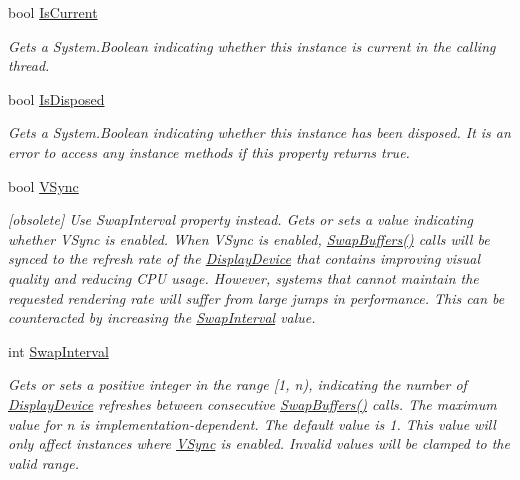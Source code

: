 \begin{DoxyCompactItemize}
bool \hyperlink{class_open_t_k_1_1_graphics_1_1_graphics_context_a7cbde7e3ab34ace4c087db96a72f6134}{Is\-Current}
\begin{DoxyCompactList}\small\item\em Gets a System.\-Boolean indicating whether this instance is current in the calling thread. \end{DoxyCompactList}\item 
bool \hyperlink{class_open_t_k_1_1_graphics_1_1_graphics_context_ade92f0f31700dbb2a64eed7336bca89d}{Is\-Disposed}
\begin{DoxyCompactList}\small\item\em Gets a System.\-Boolean indicating whether this instance has been disposed. It is an error to access any instance methods if this property returns true. \end{DoxyCompactList}\item 
bool \hyperlink{class_open_t_k_1_1_graphics_1_1_graphics_context_a502b2543a983bba6ceba9762212e290b}{V\-Sync}
\begin{DoxyCompactList}\small\item\em \mbox{[}obsolete\mbox{]} Use Swap\-Interval property instead. Gets or sets a value indicating whether V\-Sync is enabled. When V\-Sync is enabled, \hyperlink{class_open_t_k_1_1_graphics_1_1_graphics_context_ab73c61bea26369cf76dff2165f5084cf}{Swap\-Buffers()} calls will be synced to the refresh rate of the \hyperlink{class_open_t_k_1_1_display_device}{Display\-Device} that contains improving visual quality and reducing C\-P\-U usage. However, systems that cannot maintain the requested rendering rate will suffer from large jumps in performance. This can be counteracted by increasing the \hyperlink{class_open_t_k_1_1_graphics_1_1_graphics_context_a860ca9db2d767d969b0b5a6c9b7b0f46}{Swap\-Interval} value. \end{DoxyCompactList}\item 
int \hyperlink{class_open_t_k_1_1_graphics_1_1_graphics_context_a860ca9db2d767d969b0b5a6c9b7b0f46}{Swap\-Interval}
\begin{DoxyCompactList}\small\item\em Gets or sets a positive integer in the range \mbox{[}1, n), indicating the number of \hyperlink{class_open_t_k_1_1_display_device}{Display\-Device} refreshes between consecutive \hyperlink{class_open_t_k_1_1_graphics_1_1_graphics_context_ab73c61bea26369cf76dff2165f5084cf}{Swap\-Buffers()} calls. The maximum value for n is implementation-\/dependent. The default value is 1. This value will only affect instances where \hyperlink{class_open_t_k_1_1_graphics_1_1_graphics_context_a502b2543a983bba6ceba9762212e290b}{V\-Sync} is enabled. Invalid values will be clamped to the valid range. \end{DoxyCompactList}\item 

\end{DoxyCompactItemize}

